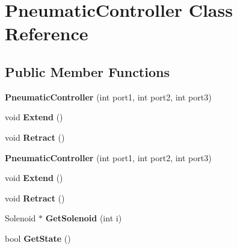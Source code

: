 \hypertarget{class_pneumatic_controller}{\section{Pneumatic\-Controller Class Reference}
\label{class_pneumatic_controller}
}
\subsection*{Public Member Functions}
\begin{DoxyCompactItemize}
\item 
\hypertarget{class_pneumatic_controller_acac78be574146f7965268a05550949d1}{{\bfseries Pneumatic\-Controller} (int port1, int port2, int port3)}\label{class_pneumatic_controller_acac78be574146f7965268a05550949d1}

\item 
\hypertarget{class_pneumatic_controller_a328609849a52748de3fb1b46a4ea0a82}{void {\bfseries Extend} ()}\label{class_pneumatic_controller_a328609849a52748de3fb1b46a4ea0a82}

\item 
\hypertarget{class_pneumatic_controller_a9cb7f96e438d830a0d3f2fb6bb256fe9}{void {\bfseries Retract} ()}\label{class_pneumatic_controller_a9cb7f96e438d830a0d3f2fb6bb256fe9}

\item 
\hypertarget{class_pneumatic_controller_acac78be574146f7965268a05550949d1}{{\bfseries Pneumatic\-Controller} (int port1, int port2, int port3)}\label{class_pneumatic_controller_acac78be574146f7965268a05550949d1}

\item 
\hypertarget{class_pneumatic_controller_a328609849a52748de3fb1b46a4ea0a82}{void {\bfseries Extend} ()}\label{class_pneumatic_controller_a328609849a52748de3fb1b46a4ea0a82}

\item 
\hypertarget{class_pneumatic_controller_a9cb7f96e438d830a0d3f2fb6bb256fe9}{void {\bfseries Retract} ()}\label{class_pneumatic_controller_a9cb7f96e438d830a0d3f2fb6bb256fe9}

\item 
\hypertarget{class_pneumatic_controller_a50e4aa1e4600c8d0741e9dbc05ec4c01}{Solenoid $\ast$ {\bfseries Get\-Solenoid} (int i)}\label{class_pneumatic_controller_a50e4aa1e4600c8d0741e9dbc05ec4c01}

\item 
\hypertarget{class_pneumatic_controller_a9bbc80dafd1575b43297d5ec10f99e1a}{bool {\bfseries Get\-State} ()}\label{class_pneumatic_controller_a9bbc80dafd1575b43297d5ec10f99e1a}

\end{DoxyCompactItemize}

